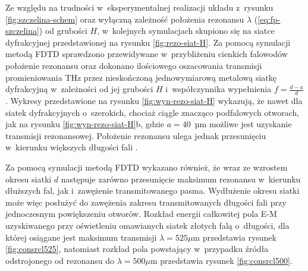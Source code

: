 Ze względu na trudności w~eksperymentalnej realizacji układu z~rysunku \ref{fig:szczelina-schem} oraz wyłączną zależność położenia rezonansu $\lambda$ (\ref{eq:fp-szczelina}) od grubości $H$, w~kolejnych symulacjach skupiono się na siatce dyfrakcyjnej przedstawionej na rysunku \ref{fig:rezo-siat-H}.  Za pomocą symulacji metodą FDTD sprawdzono przewidywane w~przybliżeniu cienkich falowodów położenie rezonansu oraz dokonano ilościowego oszacowania transmisji promieniowania THz przez nieskończoną jednowymiarową metalową siatkę dyfrakcyjną w~zależności od jej grubości $H$ i~współczynnika wypełnienia $f=\frac{d-a}{d}$. Wykresy przedstawione na rysunku \ref{fig:wyn-rezo-siat-H} wykazują, że nawet dla siatek dyfrakcyjnych o~szerokich, chociaż ciągle znacząco podfalowych otworach, jak na rysunku \ref{fig:wyn-rezo-siat-H}b, gdzie $a=40$~µm możliwe jest uzyskanie transmisji rezonansowej. Położenie rezonansu ulega jednak przesunięciu w~kierunku większych długości fali \cite{Szczytko2012271}.

Za pomocą symulacji metodą FDTD wykazano również, że wraz ze wzrostem okresu siatki $d$ następuje zarówno przesunięcie maksimum rezonansu w~kierunku dłuższych fal, jak i~zawężenie transmitowanego pasma. Wydłużenie okresu siatki może więc posłużyć do zawężenia zakresu transmitowanych długości fali przy jednoczesnym powiększeniu otworów. Rozkład energii całkowitej pola E-M uzyskiwanego przy oświetleniu omawianych siatek złotych falą o~długości, dla której osiągane jest maksimum transmisji $\lambda=525 \mu$m przedstawia rysunek \ref{fig:consrcl525}, natomiast rozkład pola powstający w~przypadku źródła odstrojonego od rezonansu do $\lambda=500\mu$m przedstawia rysunek \ref{fig:consrcl500}.

